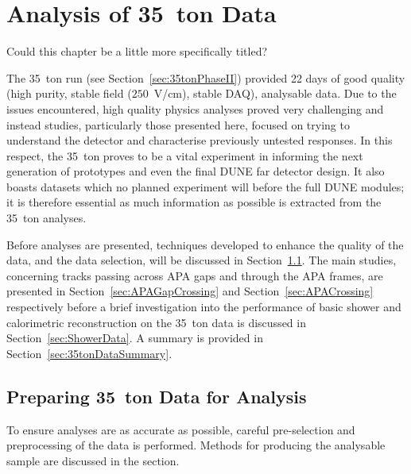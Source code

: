 
\graphicspath{{35tonAnalysis/Figs/}}

\chapter{Analysis of 35~ton Data}\label{chap:35tonAnalysis}

{\color{red} Could this chapter be a little more specifically titled?}

The 35~ton run (see Section~\ref{sec:35tonPhaseII}) provided 22 days of good quality (high purity, stable field ($250$~V/cm), stable DAQ), analysable data.  Due to the issues encountered, high quality physics analyses proved very challenging and instead studies, particularly those presented here, focused on trying to understand the detector and characterise previously untested responses.  In this respect, the 35~ton proves to be a vital experiment in informing the next generation of prototypes and even the final DUNE far detector design.  It also boasts datasets which no planned experiment will before the full DUNE modules; it is therefore essential as much information as possible is extracted from the 35~ton analyses.

Before analyses are presented, techniques developed to enhance the quality of the data, and the data selection, will be discussed in Section~\ref{sec:Preparing35tonData}.  The main studies, concerning tracks passing across APA gaps and through the APA frames, are presented in Section~\ref{sec:APAGapCrossing} and Section~\ref{sec:APACrossing} respectively before a brief investigation into the performance of basic shower and calorimetric reconstruction on the 35~ton data is discussed in Section~\ref{sec:ShowerData}.  A summary is provided in Section~\ref{sec:35tonDataSummary}.

\section{Preparing 35~ton Data for Analysis}\label{sec:Preparing35tonData}

To ensure analyses are as accurate as possible, careful pre-selection and preprocessing of the data is performed.  Methods for producing the analysable sample are discussed in the section.

